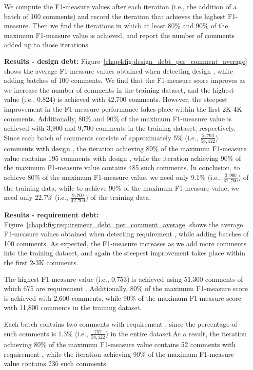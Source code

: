 We compute the F1-measure values after each iteration (i.e., the addition of a batch of 100 comments) and record the iteration that achieves the highest F1-measure. Then we find the iterations in which at least 80\% and 90\% of the maximum F1-measure value is achieved, and report the number of comments added up to those iterations.

\noindent \textbf{Results - design debt:} Figure~\ref{chap4:fig:design_debt_per_comment_average} shows the average F1-measure values obtained when detecting design \SATD, while adding batches of 100 comments. We find that the F1-measure score improves as we increase the number of comments in the training dataset, and the highest value (i.e., 0.824) is achieved with 42,700 comments. However, the steepest improvement in the F1-measure performance takes place within the first 2K-4K comments. Additionally, 80\% and 90\% of the maximum F1-measure value is achieved with 3,900 and 9,700 comments in the training dataset, respectively.
Since each batch of comments consists of approximately 5\% (i.e., $\frac{2,703}{58,122}$) comments with design \SATD, the iteration achieving 80\% of the maximum F1-measure value contains 195 comments with design \SATD,
while the iteration achieving 90\% of the maximum F1-measure value contains 485 such comments.
In conclusion, to achieve 80\% of the maximum F1-measure value, we need only 9.1\% (i.e., $\frac{3,900}{42,700}$) of the training data, while to achieve 90\% of the maximum F1-measure value, we need only 22.7\% (i.e., $\frac{9,700}{42,700}$) of the training data.

\noindent \textbf{Results - requirement debt:} Figure~\ref{chap4:fig:requirement_debt_per_comment_average} shows the average F1-measure values obtained when detecting requirement \SATD, while adding batches of 100 comments. As expected, the F1-measure increases as we add more comments into the training dataset, and again the steepest improvement takes place within the first 2-3K comments.

The highest F1-measure value (i.e., 0.753) is achieved using 51,300 comments of which 675 are requirement \SATD. Additionally, 80\% of the maximum F1-measure score is achieved with 2,600 comments, while 90\% of the maximum F1-measure score with 11,800 comments in the training dataset.

Each batch contains two comments with requirement \SATD, since the percentage of such comments is 1.3\% (i.e., $\frac{757}{58,122}$) in the entire dataset.As a result, the iteration achieving 80\% of the maximum F1-measure value contains 52 comments with requirement \SATD, while the iteration achieving 90\% of the maximum F1-measure value contains 236 such comments.

